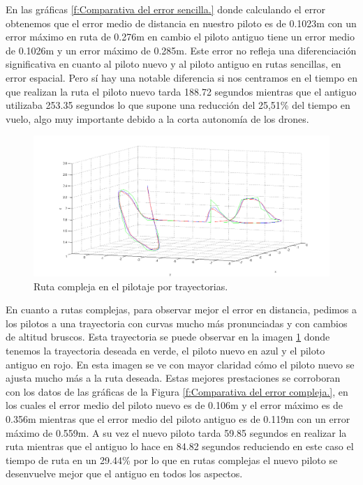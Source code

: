 \hspace{1cm} En las gráficas \ref{f:Comparativa del error sencilla.} donde calculando el error obtenemos que el error medio de distancia en nuestro piloto es de 0.1023m con un error máximo en ruta de 0.276m en cambio el piloto antiguo tiene un error medio de 0.1026m y un error máximo de 0.285m. Este error no refleja una diferenciación significativa en cuanto al piloto nuevo y al piloto antiguo en rutas sencillas, en error espacial. Pero sí hay una notable diferencia si nos centramos en el tiempo en que realizan la ruta el piloto nuevo tarda 188.72 segundos mientras que el antiguo utilizaba 253.35 segundos lo que supone una reducción del 25,51\% del tiempo en vuelo, algo muy importante debido a la corta autonomía de los drones.

\begin{figure}[H]
	\begin{center}
		\includegraphics[width=1\textwidth]{imag/IMG41.png}
				\caption{Ruta compleja en el pilotaje por trayectorias.}
		\label{fig:Ruta compleja en trayectoria.}	
	\end{center}
\end{figure}

\hspace{1cm} En cuanto a rutas complejas, para observar mejor el error en distancia, pedimos a los pilotos a una trayectoria con curvas mucho más pronunciadas y con cambios de altitud bruscos. Esta trayectoria se puede observar en la imagen \ref{fig:Ruta compleja en trayectoria.} donde tenemos la trayectoria deseada en verde, el piloto nuevo en azul y el piloto antiguo en rojo. En esta imagen se ve con mayor claridad cómo el piloto nuevo se ajusta mucho más a la ruta deseada. Estas mejores prestaciones se corroboran con los datos de las gráficas de la Figura \ref{f:Comparativa del error compleja.}, en los cuales el error medio del piloto nuevo es de 0.106m y el error máximo es de 0.356m mientras que el error medio del piloto antiguo es de 0.119m con un error máximo de 0.559m. A su vez el nuevo piloto tarda 59.85 segundos en realizar la ruta mientras que el antiguo lo hace en 84.82 segundos reduciendo en este caso el tiempo de ruta en un 29.44\% por lo que en rutas complejas el nuevo piloto se desenvuelve mejor que el antiguo en todos los aspectos.

